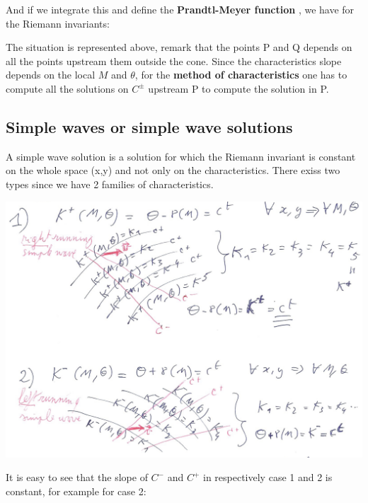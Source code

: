 	And if we integrate this and define the \textbf{Prandtl-Meyer function} , we have for the Riemann invariants: 
	
	\begin{center}
	\end{center}
	
	
	The situation is represented above, remark that the points P and Q depends on all the points upstream them outside the cone. Since the characteristics slope depends on the local $M$ and $\theta$,  for the \textbf{method of characteristics} one has to compute all the solutions on $C^\pm$ upstream P to compute the solution in P. 
	
\subsection{Simple waves or simple wave solutions}
	A simple wave solution is a solution for which the Riemann invariant is constant on the whole space (x,y)	and not only on the characteristics. There exiss two types since we have 2 families of characteristics. 
	
	\begin{center}
	\includegraphics[scale=0.3]{ch8/21}
	\end{center}
	
	It is easy to see that the slope of $C^-$ and $C^+$ in respectively case 1 and 2 is constant, for example for case 2: 
	
